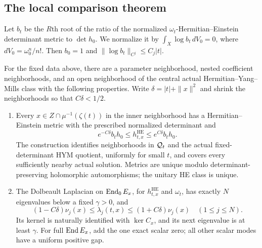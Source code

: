 \subsection{The local comparison theorem}
Let $b_t$ be the $R$th root of the ratio of the normalized
$\omega_t$-Hermitian--Einstein determinant metric to $\det h_0$.
We normalize it by $\int_X\log b_t\,dV_0=0$, where
$dV_0=\omega_0^n/n!$.
Then $b_0=1$ and $\|\log b_t\|_{C^j}\le C_j|t|$.

\begin{theorem}\label{thm:main}
For the fixed data above, there are a parameter neighborhood, nested
coefficient neighborhoods, and an open neighborhood of the central
actual Hermitian--Yang--Mills class with the following properties.
Write $\delta=|t|+\|x\|^2$ and shrink the neighborhoods so that
$C\delta<1/2$.
\begin{enumerate}
\item Every $x\in Z\cap\mu^{-1}(\zeta(t))$ in the inner neighborhood
has a Hermitian--Einstein metric with the prescribed normalized
determinant and
\begin{equation}\label{eq:metric-main}
 e^{-C\delta}b_th_0\le h^{\mathrm{HE}}_{t,x}
                         \le e^{C\delta}b_th_0.
\end{equation}
The construction identifies neighborhoods in $\mathcal Q_t$ and the actual
fixed-determinant HYM quotient, uniformly for small $t$, and covers
every sufficiently nearby actual solution. Metrics are unique modulo
determinant-preserving holomorphic automorphisms; the unitary HE class
is unique.

\item The Dolbeault Laplacian on $\operatorname{End}_0E_x$, for
$h^{\mathrm{HE}}_{t,x}$ and $\omega_t$, has exactly $N$ eigenvalues
below a fixed $\gamma>0$, and
\begin{equation}\label{eq:spectrum-main}
 (1-C\delta)\nu_j(x)\le\lambda_j(t,x)\le
 (1+C\delta)\nu_j(x)\quad(1\le j\le N).
\end{equation}
Its kernel is naturally identified with $\ker C_x$, and its next
eigenvalue is at least $\gamma$. For full $\operatorname{End} E_x$, add the one
exact scalar zero; all other scalar modes have a uniform positive gap.


\end{enumerate}
\end{theorem}
